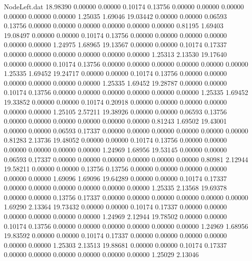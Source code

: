 \begin{filecontents}{NodeLeft.dat}
  18.98390    0.00000    0.00000     0.10174    0.13756    0.00000    0.00000    0.00000    0.00000    0.00000    0.00000    1.25035    1.69046
  19.03442    0.00000    0.00000     0.06593    0.13756    0.00000    0.00000    0.00000    0.00000    0.00000    0.00000    0.81195    1.69403
  19.08497    0.00000    0.00000     0.10174    0.13756    0.00000    0.00000    0.00000    0.00000    0.00000    0.00000    1.24975    1.68965
  19.13567    0.00000    0.00000     0.10174    0.17337    0.00000    0.00000    0.00000    0.00000    0.00000    0.00000    1.25313    2.13530
  19.17640    0.00000    0.00000     0.10174    0.13756    0.00000    0.00000    0.00000    0.00000    0.00000    0.00000    1.25335    1.69452
  19.24717    0.00000    0.00000     0.10174    0.13756    0.00000    0.00000    0.00000    0.00000    0.00000    0.00000    1.25335    1.69452
  19.28787    0.00000    0.00000     0.10174    0.13756    0.00000    0.00000    0.00000    0.00000    0.00000    0.00000    1.25335    1.69452
  19.33852    0.00000    0.00000     0.10174    0.20918    0.00000    0.00000    0.00000    0.00000    0.00000    0.00000    1.25105    2.57211
  19.38926    0.00000    0.00000     0.06593    0.13756    0.00000    0.00000    0.00000    0.00000    0.00000    0.00000    0.81243    1.69502
  19.43001    0.00000    0.00000     0.06593    0.17337    0.00000    0.00000    0.00000    0.00000    0.00000    0.00000    0.81283    2.13736
  19.48052    0.00000    0.00000     0.10174    0.13756    0.00000    0.00000    0.00000    0.00000    0.00000    0.00000    1.24969    1.68956
  19.53145    0.00000    0.00000     0.06593    0.17337    0.00000    0.00000    0.00000    0.00000    0.00000    0.00000    0.80981    2.12944
  19.58211    0.00000    0.00000     0.13756    0.13756    0.00000    0.00000    0.00000    0.00000    0.00000    0.00000    1.69096    1.69096
  19.64289    0.00000    0.00000     0.10174    0.17337    0.00000    0.00000    0.00000    0.00000    0.00000    0.00000    1.25335    2.13568
  19.69378    0.00000    0.00000     0.13756    0.17337    0.00000    0.00000    0.00000    0.00000    0.00000    0.00000    1.69290    2.13364
  19.73432    0.00000    0.00000     0.10174    0.17337    0.00000    0.00000    0.00000    0.00000    0.00000    0.00000    1.24969    2.12944
  19.78502    0.00000    0.00000     0.10174    0.13756    0.00000    0.00000    0.00000    0.00000    0.00000    0.00000    1.24969    1.68956
  19.83592    0.00000    0.00000     0.10174    0.17337    0.00000    0.00000    0.00000    0.00000    0.00000    0.00000    1.25303    2.13513
  19.88681    0.00000    0.00000     0.10174    0.17337    0.00000    0.00000    0.00000    0.00000    0.00000    0.00000    1.25029    2.13046

\end{filecontents}
